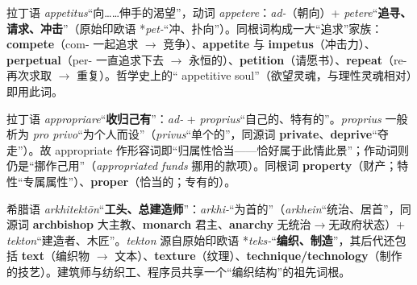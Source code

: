\documentclass[../main.tex]{subfiles}
\begin{document}


\begin{origin}
拉丁语 \textit{appetitus}“向……伸手的渴望”，动词 \textit{appetere}：\textit{ad-}（朝向）+ \textit{petere}“\textbf{追寻、请求、冲击}”（原始印欧语 *\textit{pet-}“冲、扑向”）。同根词构成一大“追求”家族：\textbf{compete}（com- 一起追求 $\to$ 竞争）、\textbf{appetite} 与 \textbf{impetus}（冲击力）、\textbf{perpetual}（per- 一直追求下去 $\to$ 永恒的）、\textbf{petition}（请愿书）、\textbf{repeat}（re- 再次求取 $\to$ 重复）。哲学史上的“ appetitive soul”（欲望灵魂，与理性灵魂相对）即用此词。
\end{origin}



\begin{origin}
拉丁语 \textit{appropriare}“\textbf{收归己有}”：\textit{ad-} + \textit{proprius}“自己的、特有的”。\textit{proprius} 一般析为 \textit{pro privo}“为个人而设”（\textit{privus}“单个的”，同源词 \textbf{private}、\textbf{deprive}“夺走”）。故 appropriate 作形容词即“归属性恰当——恰好属于此情此景”；作动词则仍是“挪作己用”（\textit{appropriated funds} 挪用的款项）。同根词 \textbf{property}（财产；特性“专属属性”）、\textbf{proper}（恰当的；专有的）。
\end{origin}




\begin{origin}
希腊语 \textit{arkhitektōn}“\textbf{工头、总建造师}”：\textit{arkhi-}“为首的”（\textit{arkhein}“统治、居首”，同源词 \textbf{archbishop} 大主教、\textbf{monarch} 君主、\textbf{anarchy} 无统治$\to$无政府状态）+ \textit{tekton}“建造者、木匠”。\textit{tekton} 源自原始印欧语 *\textit{teks-}“\textbf{编织、制造}”，其后代还包括 \textbf{text}（编织物 $\to$ 文本）、\textbf{texture}（纹理）、\textbf{technique/technology}（制作的技艺）。建筑师与纺织工、程序员共享一个“编织结构”的祖先词根。
\end{origin}
\end{document}
